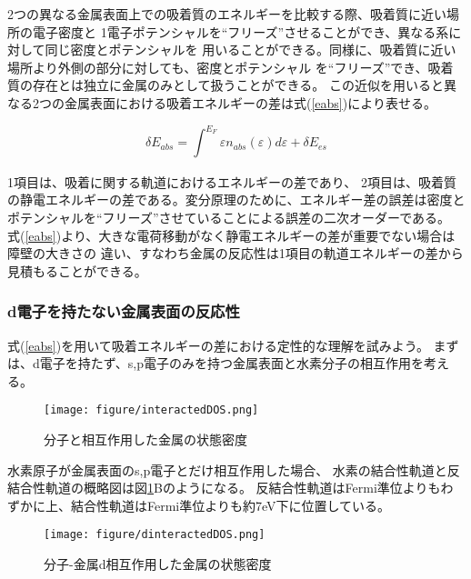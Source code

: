 \documentclass[12pt]{ltjsarticle}
\begin{document}
2つの異なる金属表面上での吸着質のエネルギーを比較する際、吸着質に近い場所の電子密度と
1電子ポテンシャルを“フリーズ”させることができ、異なる系に対して同じ密度とポテンシャルを
用いることができる。同様に、吸着質に近い場所より外側の部分に対しても、密度とポテンシャル
を“フリーズ”でき、吸着質の存在とは独立に金属のみとして扱うことができる。
この近似を用いると異なる2つの金属表面における吸着エネルギーの差は式(\ref{eabs})により表せる。

\begin{equation}
    \label{eabs}
    \delta E_{abs} = \int_{}^{E_F} \varepsilon n_{abs}(\varepsilon) d\varepsilon + 
    \delta E_{es}
\end{equation}

1項目は、吸着に関する軌道におけるエネルギーの差であり、
2項目は、吸着質の静電エネルギーの差である。変分原理のために、エネルギー差の誤差は密度と
ポテンシャルを“フリーズ”させていることによる誤差の二次オーダーである。
式(\ref{eabs})より、大きな電荷移動がなく静電エネルギーの差が重要でない場合は障壁の大きさの
違い、すなわち金属の反応性は1項目の軌道エネルギーの差から見積もることができる。

\subsubsection{d電子を持たない金属表面の反応性}
式(\ref{eabs})を用いて吸着エネルギーの差における定性的な理解を試みよう。
まずは、d電子を持たず、s,p電子のみを持つ金属表面と水素分子の相互作用を考える。

\begin{figure}[hbtp]
    \begin{center}
     \texttt{[image: figure/interactedDOS.png]}
    \end{center}
    \caption{分子と相互作用した金属の状態密度}
    \label{fig:interactedDOS}
\end{figure}

水素原子が金属表面のs,p電子とだけ相互作用した場合、
水素の結合性軌道と反結合性軌道の概略図は図\ref{fig:interactedDOS}Bのようになる。
反結合性軌道はFermi準位よりもわずかに上、結合性軌道はFermi準位よりも約7eV下に位置している。

\begin{figure}[hbtp]
    \begin{center}
     \texttt{[image: figure/dinteractedDOS.png]}
    \end{center}
    \caption{分子-金属d相互作用した金属の状態密度}
    \label{fig:dinteractedDOS}
\end{figure}
\end{document}
